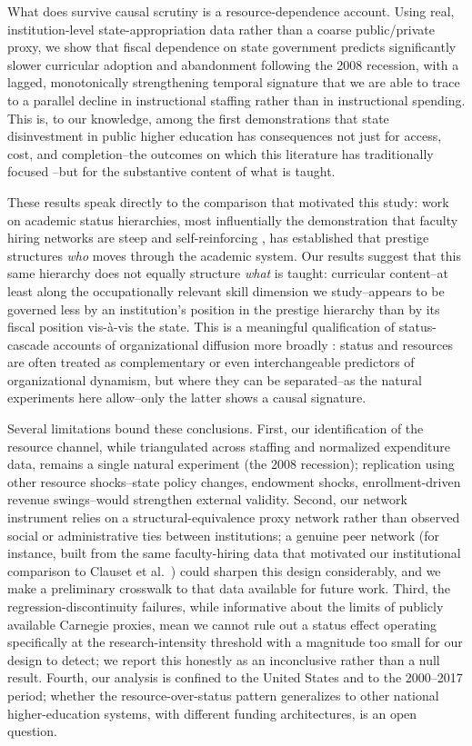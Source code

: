 \documentclass[11pt, letterpaper]{article}
\newcommand{\parencite}[1]{\cite{#1}}
\begin{document}
What does survive causal scrutiny is a resource-dependence account. Using real, institution-level state-appropriation data rather than a coarse public/private proxy, we show that fiscal dependence on state government predicts significantly slower curricular adoption and abandonment following the 2008 recession, with a lagged, monotonically strengthening temporal signature that we are able to trace to a parallel decline in instructional staffing rather than in instructional spending. This is, to our knowledge, among the first demonstrations that state disinvestment in public higher education has consequences not just for access, cost, and completion--the outcomes on which this literature has traditionally focused \parencite{demingwalters2017}--but for the substantive content of what is taught.

These results speak directly to the comparison that motivated this study: work on academic status hierarchies, most influentially the demonstration that faculty hiring networks are steep and self-reinforcing \parencite{clauset2015}, has established that prestige structures \emph{who} moves through the academic system. Our results suggest that this same hierarchy does not equally structure \emph{what} is taught: curricular content--at least along the occupationally relevant skill dimension we study--appears to be governed less by an institution's position in the prestige hierarchy than by its fiscal position vis-\`a-vis the state. This is a meaningful qualification of status-cascade accounts of organizational diffusion more broadly \parencite{strangsoule1998, dimaggiopowell1983}: status and resources are often treated as complementary or even interchangeable predictors of organizational dynamism, but where they can be separated--as the natural experiments here allow--only the latter shows a causal signature.

Several limitations bound these conclusions. First, our identification of the resource channel, while triangulated across staffing and normalized expenditure data, remains a single natural experiment (the 2008 recession); replication using other resource shocks--state policy changes, endowment shocks, enrollment-driven revenue swings--would strengthen external validity. Second, our network instrument relies on a structural-equivalence proxy network rather than observed social or administrative ties between institutions; a genuine peer network (for instance, built from the same faculty-hiring data that motivated our institutional comparison to Clauset et al.\ \parencite{clauset2015}) could sharpen this design considerably, and we make a preliminary crosswalk to that data available for future work. Third, the regression-discontinuity failures, while informative about the limits of publicly available Carnegie proxies, mean we cannot rule out a status effect operating specifically at the research-intensity threshold with a magnitude too small for our design to detect; we report this honestly as an inconclusive rather than a null result. Fourth, our analysis is confined to the United States and to the 2000--2017 period; whether the resource-over-status pattern generalizes to other national higher-education systems, with different funding architectures, is an open question.
\end{document}
